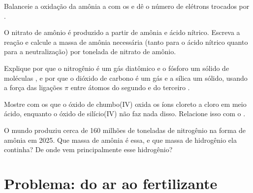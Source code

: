 \begin{exercise}[$\star\star$]\label{exo:b1:p-block-13-15:8}
Balanceie a oxidação da amônia a  com os  e dê
o número de elétrons trocados por .
\end{exercise}

\begin{exercise}[$\star\star$]\label{exo:b1:p-block-13-15:9}
O nitrato de amônio é produzido a partir de amônia e ácido nítrico.
Escreva a reação e calcule a massa de amônia necessária (tanto para o
ácido nítrico quanto para a neutralização) por tonelada de nitrato de amônio.
\end{exercise}

\begin{exercise}[$\star\star\star$]\label{exo:b1:p-block-13-15:10}
Explique por que o nitrogênio é um gás diatômico e o fósforo um sólido de
moléculas , e por que o dióxido de carbono é um gás e a sílica um
sólido, usando a força das ligações $\pi$ entre átomos do segundo e do
terceiro .
\end{exercise}

\begin{exercise}[$\star\star\star$]\label{exo:b1:p-block-13-15:11}
Mostre com os  que o óxido de chumbo(IV) oxida os íons
cloreto a cloro em meio ácido, enquanto o óxido de silício(IV) não faz
nada disso. Relacione isso com o .
\end{exercise}

\begin{exercise}[$\star\star\star$]\label{exo:b1:p-block-13-15:12}
O mundo produziu cerca de 160 milhões de toneladas de nitrogênio na forma
de amônia em 2025. Que massa de amônia é essa, e que massa de hidrogênio
ela continha? De onde vem principalmente esse hidrogênio?
\end{exercise}

\section{Problema: do ar ao fertilizante}

